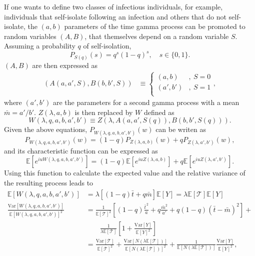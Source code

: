 \documentclass[sr]{drdc-report}
\def\mbar{\ensuremath{{}\bar{m}}}
\def\tbar{\ensuremath{{}\bar{t}}}
\newcommand{\Tau}{\mathcal{T}}
\newcommand{\ex}[1]{\mathbb{E}\left[#1\right]}
\newcommand{\var}[1]{\mathrm{Var}\left[#1\right]}
\begin{document}
If one wants to define two classes of infectious individuals, for example, individuals that self-isolate following an infection and others that do not self-isolate, the $(a,b)$ parameters of the time gamma process can be promoted to random variables $(A,B)$, that themselves depend on a random variable $S$.
Assuming a probability $q$ of self-isolation,
\begin{equation}
P_{S(q)}(s)=q^s(1-q)^s,\quad s\in\{0,1\}.
\end{equation}
$(A,B)$ are then expressed as
\begin{align}
(A(a, a', S),B(b, b', S)) & \equiv \begin{cases}
(a,b)&,\ S=0\\
(a',b')&,\ S=1\\
\end{cases},
\end{align}
where $(a',b')$ are the parameters for a second gamma process with a mean $\mbar=a'/b'$.
$Z(\lambda,a,b)$ is then replaced by $W$ defined as
\begin{equation}
W(\lambda,q,a,b,a',b')\equiv Z(\lambda,A(a,a',S(q)),B(b,b',S(q))).
\end{equation}
Given the above equations, $P_{W(\lambda,q,a,b,a',b')}(w)$ can be writen as
\begin{equation}
P_{W(\lambda,q,a,b,a',b')}(w)=(1-q)P_{Z(\lambda,a,b)}(w)+qP_{Z(\lambda,a',b')}(w),
\end{equation}
and its characteristic function can be expressed as
\begin{equation}
\ex{e^{iuW(\lambda,q,a,b,a',b')}} = (1-q)\ex{e^{iuZ(\lambda,a,b)}} + q\ex{e^{iuZ(\lambda,a',b')}}.
\end{equation}
Using this function to calculate the expected value and the relative variance of the resulting process leads to
\begin{align}
\ex{W(\lambda,q,a,b,a',b')} & = \lambda\left[(1-q)\tbar+q\mbar\right]\ex{Y} = \lambda\ex{\Tau}\ex{Y}\label{exw}\\
\frac{\var{W(\lambda,q,a,b,a',b')}}{\ex{W(\lambda,q,a,b,a',b')}^2} & = \frac{1}{\ex{\Tau}^2}\left[(1-q)\frac{{\tbar\hspace{1pt}}^2}{a} + q\frac{{\mbar}^2}{a'}+q(1-q)(\tbar-\mbar)^2\right]+\nonumber\\
& \qquad\frac{1}{\lambda\ex{\Tau}}\left[1+\frac{\var{Y}}{\ex{Y}^2}\right]\label{varw}\\
& = \frac{\var{\Tau}}{\ex{\Tau}^2} + \frac{\var{N(\lambda\ex{\Tau}\hspace{1pt})}}{\ex{N(\lambda\ex{\Tau}\hspace{1pt})}^2} + \frac{1}{\ex{N(\lambda\ex{\Tau}\hspace{1pt})}}\frac{\var{Y}}{\ex{Y}^2},\label{varwg}
\end{align}
\end{document}
